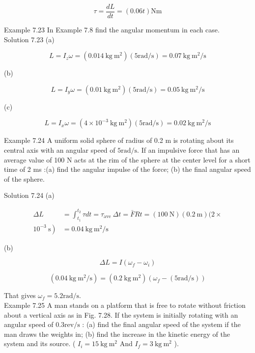 \documentclass[10pt]{article}
\begin{document}
$$
\tau=\frac{d L}{d t}=(0.06 t) \mathrm{N} \mathrm{m}
$$

Example 7.23 In Example 7.8 find the angular momentum in each case.\\
Solution 7.23 (a)

$$
L=I_{z} \omega=\left(0.014 \mathrm{~kg} \mathrm{~m}^{2}\right)(5 \mathrm{rad} / \mathrm{s})=0.07 \mathrm{~kg} \mathrm{~m}^{2} / \mathrm{s}
$$

(b)

$$
L=I_{y} \omega=\left(0.01 \mathrm{~kg} \mathrm{~m}^{2}\right)(5 \mathrm{rad} / \mathrm{s})=0.05 \mathrm{~kg} \mathrm{~m}^{2} / \mathrm{s}
$$

(c)

$$
L=I_{x} \omega=\left(4 \times 10^{-3} \mathrm{~kg} \mathrm{~m}^{2}\right)(5 \mathrm{rad} / \mathrm{s})=0.02 \mathrm{~kg} \mathrm{~m}^{2} / \mathrm{s}
$$

Example 7.24 A uniform solid sphere of radius of 0.2 m is rotating about its central axis with an angular speed of $5 \mathrm{rad} / \mathrm{s}$. If an impulsive force that has an average value of 100 N acts at the rim of the sphere at the center level for a short time of 2 ms :(a) find the angular impulse of the force; (b) the final angular speed of the sphere.

Solution 7.24 (a)

$$
\begin{aligned}
\Delta L & =\int_{t_{1}}^{t_{2}} \tau d t=\tau_{\text {ave }} \Delta t=\bar{F} R t=(100 \mathrm{~N})(0.2 \mathrm{~m})(2 \times \\
\left.10^{-3} \mathrm{~s}\right) & =0.04 \mathrm{~kg} \mathrm{~m}^{2} / \mathrm{s}
\end{aligned}
$$

(b)

$$
\Delta L=I\left(\omega_{f}-\omega_{i}\right)
$$

$$
\left(0.04 \mathrm{~kg} \mathrm{~m}^{2} / \mathrm{s}\right)=\left(0.2 \mathrm{~kg} \mathrm{~m}^{2}\right)\left(\omega_{f}-(5 \mathrm{rad} / \mathrm{s})\right)
$$

That gives $\omega_{f}=5.2 \mathrm{rad} / \mathrm{s}$.\\
Example 7.25 A man stands on a platform that is free to rotate without friction about a vertical axis as in Fig. 7.28. If the system is initially rotating with an angular speed of $0.3 \mathrm{rev} / \mathrm{s}$ : (a) find the final angular speed of the system if the man draws the weights in; (b) find the increase in the kinetic energy of the system and its source. ( $I_{i}=15 \mathrm{~kg} \mathrm{~m}^{2}$ And $I_{f}=3 \mathrm{~kg} \mathrm{~m}^{2}$ ).
\end{document}

